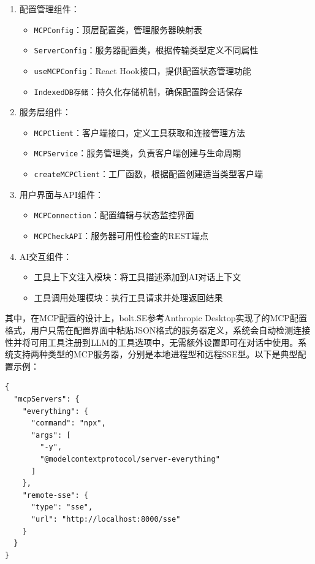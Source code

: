 \begin{enumerate}
  \item 配置管理组件：
    \begin{itemize}
      \item \texttt{MCPConfig}：顶层配置类，管理服务器映射表
      \item \texttt{ServerConfig}：服务器配置类，根据传输类型定义不同属性
      \item \texttt{useMCPConfig}：React Hook接口，提供配置状态管理功能
      \item \texttt{IndexedDB存储}：持久化存储机制，确保配置跨会话保存
    \end{itemize}
  
  \item 服务层组件：
    \begin{itemize}
      \item \texttt{MCPClient}：客户端接口，定义工具获取和连接管理方法
      \item \texttt{MCPService}：服务管理类，负责客户端创建与生命周期
      \item \texttt{createMCPClient}：工厂函数，根据配置创建适当类型客户端
    \end{itemize}
  
  \item 用户界面与API组件：
    \begin{itemize}
      \item \texttt{MCPConnection}：配置编辑与状态监控界面
      \item \texttt{MCPCheckAPI}：服务器可用性检查的REST端点
    \end{itemize}
  
  \item AI交互组件：
    \begin{itemize}
      \item 工具上下文注入模块：将工具描述添加到AI对话上下文
      \item 工具调用处理模块：执行工具请求并处理返回结果
    \end{itemize}
\end{enumerate}

其中，在MCP配置的设计上，bolt.SE参考Anthropic Desktop实现了的MCP配置格式，用户只需在配置界面中粘贴JSON格式的服务器定义，系统会自动检测连接性并将可用工具注册到LLM的工具选项中，无需额外设置即可在对话中使用。系统支持两种类型的MCP服务器，分别是本地进程型和远程SSE型。以下是典型配置示例：

\begin{verbatim}
{
  "mcpServers": {
    "everything": {
      "command": "npx",
      "args": [
        "-y",
        "@modelcontextprotocol/server-everything"
      ]
    },
    "remote-sse": {
      "type": "sse",
      "url": "http://localhost:8000/sse"
    }
  }
}
\end{verbatim}

